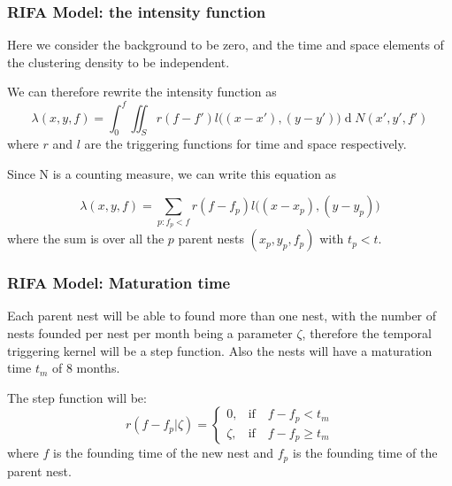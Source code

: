 \documentclass[9pt, xcolor={dvipsnames,svgnames,table}]{beamer}
\renewcommand{\d}[1]{\ensuremath{\operatorname{d}\!{#1}}}
\begin{document}
\begin{frame}
    \frametitle{RIFA Model: the intensity function}
    \textcolor{PineGreen}{Here we consider the background to be zero}, and \textcolor{PineGreen}{the time and space elements of the clustering density to be independent}.
    
    We can therefore rewrite the intensity function as
    \begin{equation*}
        \lambda(x, y, f) = \int_{0}^{f} \iint_{S} r(f-f') l\Big((x - x'), (y - y')\Big) \d N(x', y', f')
    \end{equation*}
    where $r$ and $l$ are the triggering functions for time and space respectively.

    \textcolor{PineGreen}{Since N is a counting measure, we can write this equation} as

    \begin{equation*}
        \lambda(x, y, f) = \sum_{ p: f_p < f } r(f - f_p) l \Big((x - x_p),(y - y_p) \Big)
    \end{equation*}
    where the sum is over all the $p$ parent nests $(x_p, y_p, f_p)$ with $t_p < t$.
\end{frame}





\begin{frame}
\frametitle{RIFA Model: Maturation time}
    Each parent nest will be able to found more than one nest, with the \textcolor{PineGreen}{number of nests founded per nest per month being a parameter $\zeta$}, therefore the temporal triggering kernel will be a step function. Also the nests will have a \textcolor{PineGreen}{maturation time $t_m$ of 8 months}. 

    The step function will be:
    \begin{equation*}
        r (f - f_p | \zeta) =
        \begin{cases}
            0, & \mbox{if} \quad f - f_p < t_{m} \\
            \zeta, & \mbox{if} \quad f - f_p \geq t_{m}
        \end{cases}
    \end{equation*}
    where $f$ is the founding time of the new nest and $f_p$ is the founding time of the parent nest.
\end{frame}
\end{document}
